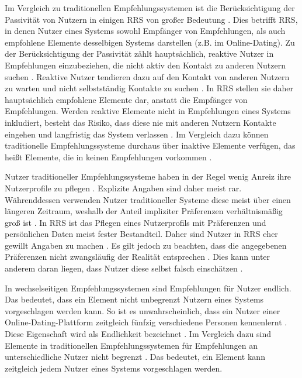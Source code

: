Im Vergleich zu traditionellen Empfehlungssystemen ist die Berücksichtigung der Passivität von Nutzern in einigen \ac{RRS} von großer Bedeutung \cite[S. 35]{li:inproceedings}.
Dies betrifft \ac{RRS}, in denen Nutzer eines Systems sowohl Empfänger von Empfehlungen, als auch empfohlene Elemente desselbigen Systems darstellen (z.B. im Online-Dating).
Zu der Berücksichtigung der Passivität zählt hauptsächlich, reaktive Nutzer in Empfehlungen einzubeziehen, die nicht aktiv den Kontakt zu anderen Nutzern suchen \cite[S. 459]{pizzato:2013}.
Reaktive Nutzer tendieren dazu auf den Kontakt von anderen Nutzern zu warten und nicht selbstständig Kontakte zu suchen \cite[S. 455]{pizzato:2013}.
In \ac{RRS} stellen sie daher hauptsächlich empfohlene Elemente dar, anstatt die Empfänger von Empfehlungen.
Werden reaktive Elemente nicht in Empfehlungen eines Systems inkludiert, besteht das Risiko, dass diese nie mit anderen Nutzern Kontakte eingehen und langfristig das System verlassen \cite[S. 35]{li:inproceedings}.
Im Vergleich dazu können traditionelle Empfehlungssysteme durchaus über inaktive Elemente verfügen, das heißt Elemente, die in keinen Empfehlungen vorkommen \cite[S. 208]{pizzato:2010}.

Nutzer traditioneller Empfehlungssysteme haben in der Regel wenig Anreiz ihre Nutzerprofile zu pflegen \cite[S. 546]{koprinska:inbook}.
Explizite Angaben sind daher meist rar.
Währenddessen verwenden Nutzer traditioneller Systeme diese meist über einen längeren Zeitraum, weshalb der Anteil impliziter Präferenzen verhältnismäßig groß ist \cite[S. 208]{pizzato:2010}.
In \ac{RRS} ist das Pflegen eines Nutzerprofils mit Präferenzen und persönlichen Daten meist fester Bestandteil.
Daher sind Nutzer in \ac{RRS} eher gewillt Angaben zu machen \cite[S. 208]{pizzato:2010}.
Es gilt jedoch zu beachten, dass die angegebenen Präferenzen nicht zwangsläufig der Realität entsprechen \cite[S. 457]{pizzato:2013}.
Dies kann unter anderem daran liegen, dass Nutzer diese selbst falsch einschätzen \cite[S. 457]{pizzato:2013}.

In wechselseitigen Empfehlungssystemen sind Empfehlungen für Nutzer endlich.
Das bedeutet, dass ein Element nicht unbegrenzt Nutzern eines Systems vorgeschlagen werden kann.
So ist es unwahrscheinlich, dass ein Nutzer einer Online-Dating-Plattform zeitgleich fünfzig verschiedene Personen kennenlernt \cite[S. 35]{li:inproceedings}.
Diese Eigenschaft wird als Endlichkeit bezeichnet \cite[S. 35]{li:inproceedings}.
Im Vergleich dazu sind Elemente in traditionellen Empfehlungssystemen für Empfehlungen an unterschiedliche Nutzer nicht begrenzt \cite[S. 1468]{yildirim:article}.
Das bedeutet, ein Element kann zeitgleich jedem Nutzer eines Systems vorgeschlagen werden.

